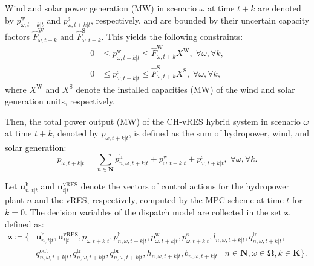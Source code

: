 \documentclass[a4paper,fleqn]{cas-sc}
\begin{document}
Wind and solar power generation (MW) in scenario $\omega$ at time $t+k$ are denoted by $p^{\mathrm{w}}_{\omega,t+k|t}$ and $p^{\mathrm{s}}_{\omega,t+k|t}$, respectively,
and are bounded by their uncertain capacity factors $\hat{F}^{\mathrm{W}}_{\omega,t+k}$ and $\hat{F}^{\mathrm{S}}_{\omega,t+k}$.
This yields the following constraints:
\begin{align}
    0 & \leq p^{\mathrm{w}}_{\omega, t+k|t} \leq \hat{F}^{\mathrm{W}}_{\omega, t+k} X^{\mathrm{W}}, \; \forall \omega, \forall k, \label{eq:cen_sto_wind}\\
    0 & \leq p^{\mathrm{s}}_{\omega, t+k|t} \leq \hat{F}^{\mathrm{S}}_{\omega, t+k} X^{\mathrm{S}}, \; \forall \omega, \forall k, \label{eq:cen_sto_solar}
\end{align}
where $X^{\mathrm{W}}$ and $X^{\mathrm{S}}$ denote the installed capacities (MW) of the wind and solar generation units, respectively.

Then, the total power output (MW) of the CH-vRES hybrid system in scenario $\omega$ at time $t+k$, denoted by $p_{\omega,t+k|t}$, is defined as the sum of hydropower, wind, and solar generation:
\begin{equation}
    p_{\omega, t+k|t} = \sum_{n \in \boldsymbol{N}} p^{\mathrm{h}}_{n, \omega, t+k|t} + p^{\mathrm{w}}_{\omega, t+k|t} + p^{\mathrm{s}}_{\omega, t+k|t}, \; \forall \omega, \forall k. \label{eq:cen_sto_power_balance}
\end{equation}

Let $\boldsymbol{u}^{\boldsymbol{\mathrm{h}}}_{n,t|t}$ and $\boldsymbol{u}^{\boldsymbol{\mathrm{vRES}}}_{t|t}$ denote the vectors of control actions for the hydropower plant $n$ and the vRES, respectively, computed by the MPC scheme at time $t$ for $k=0$.
The decision variables of the dispatch model are collected in the set $\boldsymbol{z}$, defined as:
\begin{equation}
\begin{aligned}
\boldsymbol{z} \coloneqq \Big\{
& \boldsymbol{u}^{\boldsymbol{\mathrm{h}}}_{n,t|t},
\boldsymbol{u}^{\boldsymbol{\mathrm{vRES}}}_{t|t},
p_{\omega,t+k|t},
p^{\mathrm{h}}_{n,\omega,t+k|t},
p^{\mathrm{w}}_{\omega,t+k|t},
p^{\mathrm{s}}_{\omega,t+k|t},
l_{n,\omega,t+k|t},
q^{\mathrm{in}}_{n,\omega,t+k|t}, \\
& q^{\mathrm{out}}_{n,\omega,t+k|t},
q^{\mathrm{tr}}_{n,\omega,t+k|t},
q^{\mathrm{br}}_{n,\omega,t+k|t},
h_{n,\omega,t+k|t},
b_{n,\omega,t+k|t}
\;\Big|\;
n \in \boldsymbol{N},
\omega \in \boldsymbol{\Omega},
k \in \boldsymbol{K}
\Big\}.
\end{aligned}
\end{equation}
\end{document}
